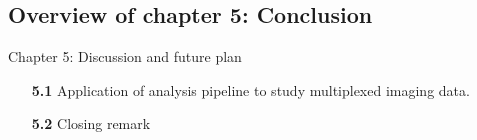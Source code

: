 \subsection{Overview of chapter 5: Conclusion}
Chapter 5: Discussion and future plan
\begin{enumerate}[align=left]
    \item[\textbf{5.1}] Application of analysis pipeline to study multiplexed imaging data.
    \item[\textbf{5.2}] Closing remark
\end{enumerate}

% 
% 
